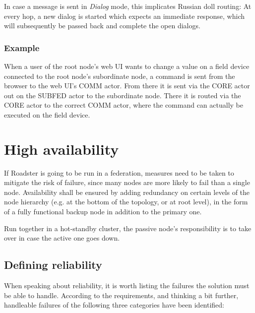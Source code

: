 In case a message is sent in \emph{Dialog} mode, this implicates Russian doll
routing: At every hop, a new dialog is started which expects an immediate
response, which will subsequently be passed back and complete the open dialogs.

\subsubsection{Example}
When a user of the root node's web UI wants to change a value on a field device
connected to the root node's subordinate node, a command is sent from the
browser to the web UI's COMM actor. From there it is sent via the CORE actor out
on the SUBFED actor to the subordinate node. There it is routed
via the CORE actor to the correct COMM actor, where the command can actually be
executed on the field device.

\section{High availability}\label{sec:approach:ha}
If Roadster is going to be run in a federation, measures need to be taken to
mitigate the risk of failure, since many nodes are more likely to fail than a
single node. Availability shall be ensured by
adding redundancy on certain levels of the node hierarchy (e.g. at the bottom
of the topology, or at root level), in the form of a
fully functional backup node in addition to the primary one.

Run together in a hot-standby cluster, the passive node's responsibility is to
take over in case the active one goes down.

\subsection{Defining reliability}
When speaking about reliability, it is worth listing the failures the solution must be
able to handle. According to the requirements, and thinking a bit further,
handleable failures of the following three categories have been identified:


